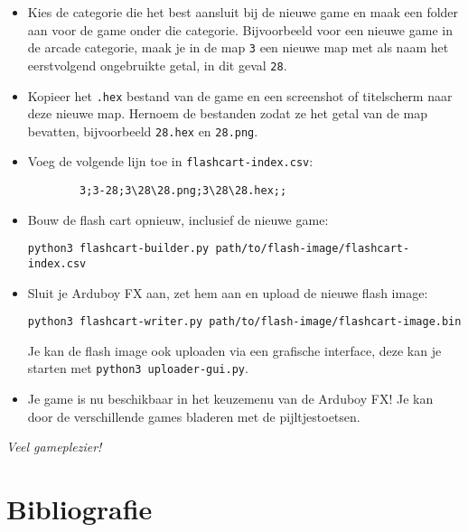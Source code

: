 \documentclass[11pt,fleqn]{book} %
\begin{document}
\begin{itemize}
\begin{itemize}
\begin{multicols}{4}
\begin{enumerate}
				\item Tools
			\end{enumerate}
		\end{multicols}
	\end{itemize}
	\item Kies de categorie die het best aansluit bij de nieuwe game en maak een folder aan voor de game onder die categorie. Bijvoorbeeld voor een nieuwe game in de arcade categorie, maak je in de map \texttt{3} een nieuwe map met als naam het eerstvolgend ongebruikte getal, in dit geval \texttt{28}.
	\item Kopieer het \texttt{.hex} bestand van de game en een screenshot of titelscherm naar deze nieuwe map. Hernoem de bestanden zodat ze het getal van de map bevatten, bijvoorbeeld \texttt{28.hex} en \texttt{28.png}.
	\item Voeg de volgende lijn toe in \texttt{flashcart-index.csv}:
	\begin{verbatim}
		3;3-28;3\28\28.png;3\28\28.hex;;
	\end{verbatim}
	\item Bouw de flash cart opnieuw, inclusief de nieuwe game:
	\begin{verbatim}
python3 flashcart-builder.py path/to/flash-image/flashcart-index.csv
	\end{verbatim}
	\item Sluit je Arduboy FX aan, zet hem aan en upload de nieuwe flash image:
	\begin{verbatim}
python3 flashcart-writer.py path/to/flash-image/flashcart-image.bin
	\end{verbatim}
	Je kan de flash image ook uploaden via een grafische interface, deze kan je starten met \texttt{python3 uploader-gui.py}.
	\item Je game is nu beschikbaar in het keuzemenu van de Arduboy FX! Je kan door de verschillende games bladeren met de pijltjestoetsen.
\end{itemize}

\vspace{1cm}

\noindent
\emph{Veel gameplezier!}




\chapter*{Bibliografie}
\end{document}
